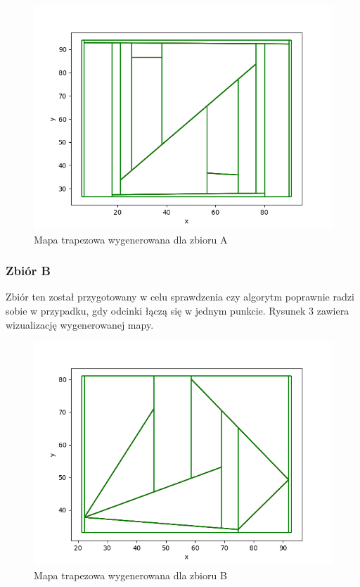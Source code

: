 \documentclass[11pt,a4paper]{article}
\begin{document}
\begin{figure}[H]
    \centering
    \includegraphics[scale=0.46]{./res/figs/test_a_map.png}
    \caption{Mapa trapezowa wygenerowana dla zbioru A}
\end{figure}

\pagebreak

\subsubsection{Zbiór B}
Zbiór ten został przygotowany w celu sprawdzenia
czy algorytm poprawnie radzi sobie w przypadku,
gdy odcinki łączą się w jednym punkcie. Rysunek 3
zawiera wizualizację wygenerowanej mapy.

\begin{figure}[H]
    \centering
    \includegraphics[scale=0.46]{./res/figs/test_b_map.png}
    \caption{Mapa trapezowa wygenerowana dla zbioru B}
\end{figure}
\end{document}
